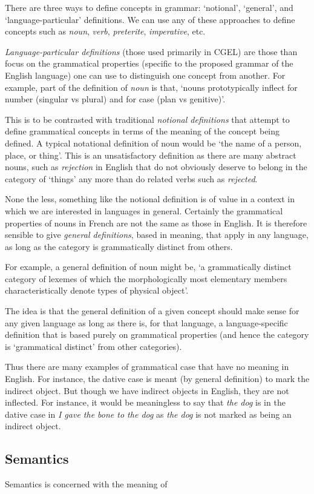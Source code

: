 \documentclass{scrarticle}
\begin{document}
There are three ways to define concepts in grammar: `notional', `general', and `language-particular'
definitions. We can use any of these approaches to define concepts such as \emph{noun}, \emph{verb},
\emph{preterite}, \emph{imperative}, etc. 

\emph{Language-particular definitions} (those used primarily in CGEL) are those than focus on the
grammatical properties (specific to the proposed grammar of the English language) one can use to
distinguish one concept from another. For example, part of the definition of \emph{noun} is that,
`nouns prototypically inflect for number (singular vs plural) and for case (plan vs genitive)'.

This is to be contrasted with traditional \emph{notional definitions} that attempt to define
grammatical concepts in terms of the meaning of the concept being defined. A typical notational
definition of noun would be `the name of a person, place, or thing'. This is an unsatisfactory
definition as there are many abstract nouns, such as \emph{rejection} in English that do not
obviously deserve to belong in the category of `things' any more than do related verbs such as
\emph{rejected}.

None the less, something like the notional definition is of value in a context in which we are
interested in languages in general. Certainly the grammatical properties of nouns in French are not
the same as those in English. It is therefore sensible to give \emph{general definitions}, based in
meaning, that apply in any language, as long as the category is grammatically distinct from others.

For example, a general definition of noun might be, `a grammatically distinct category of lexemes of
which the morphologically most elementary members characteristically denote types of physical
object'.

The idea is that the general definition of a given concept should make sense for any given language
as long as there is, for that language, a language-specific definition that is based purely on
grammatical properties (and hence the category is `grammatical distinct' from other categories).

Thus there are many examples of grammatical case that have no meaning in English. For instance, the
dative case is meant (by general definition) to mark the indirect object. But though we have
indirect objects in English, they are not inflected. For instance, it would be meaningless to say
that \emph{the dog} is in the dative case in \emph{I gave the bone to the dog} as \emph{the dog} is
not marked as being an indirect object.

\subsection{Semantics}

Semantics is concerned with the meaning of 
\end{document}
